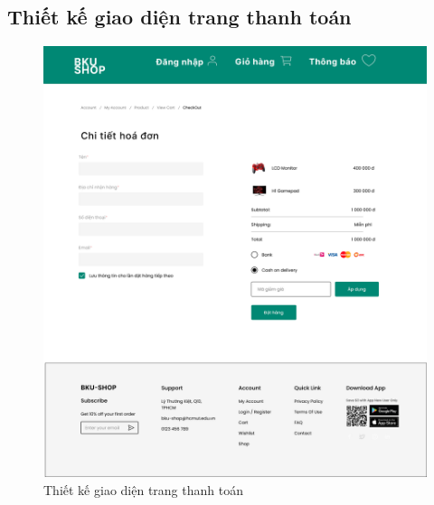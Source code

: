 \subsection {Thiết kế giao diện trang thanh toán}
\begin{figure}[H]
    \begin{center}
    \includegraphics[scale=0.3]{images/hieu/chap-4/payment.jpg}
    \vspace*{5mm}
    \caption{Thiết kế giao diện trang thanh toán}
    \end{center}
\end{figure}
